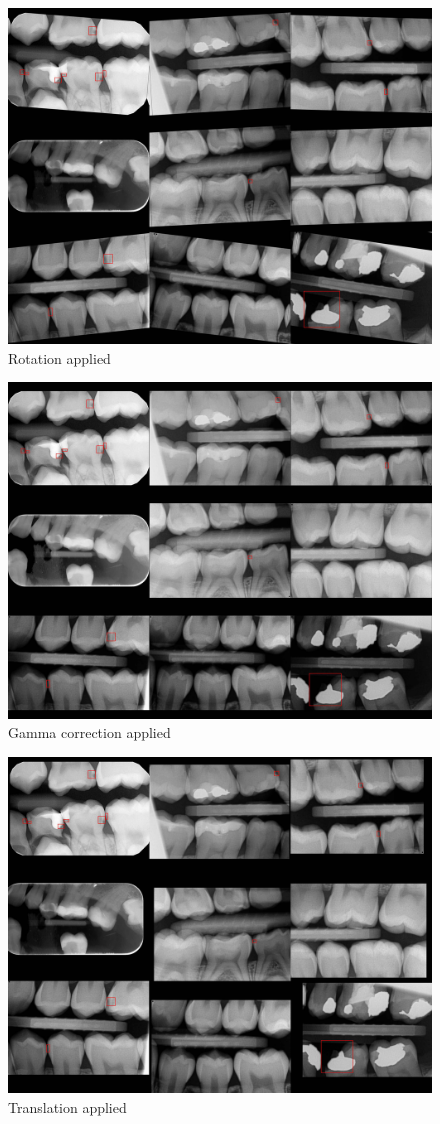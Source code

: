 \begin{figure}
    \includegraphics[width =0.9\linewidth]{images/roate_10.jpg}
    \caption{Rotation applied}
\end{figure}
\begin{figure}
    \includegraphics[width =0.9\linewidth]{images/random_gamma.jpg}
    \caption{Gamma correction applied}
\end{figure}
\begin{figure}
    \includegraphics[width =0.9\linewidth]{images/translate.jpg}
    \caption{Translation applied}
\end{figure}
